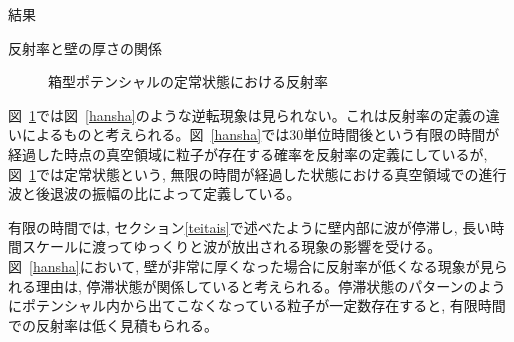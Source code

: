 \documentclass[a4paper, lualatex]{bxjsarticle}
\newcommand{\fref}[1]{図~\ref{#1}}
\begin{document}
\begin{section}{結果}
\begin{subsection}{反射率と壁の厚さの関係}
\begin{figure}[h]
            \caption{箱型ポテンシャルの定常状態における反射率}
            \label{hako}
        \end{figure}
        \par \fref{hako}では\fref{hansha}のような逆転現象は見られない。これは反射率の定義の違いによるものと考えられる。\fref{hansha}では30単位時間後という有限の時間が経過した時点の真空領域に粒子が存在する確率を反射率の定義にしているが, \fref{hako}では定常状態という, 無限の時間が経過した状態における真空領域での進行波と後退波の振幅の比によって定義している。
        \par 有限の時間では, セクション\ref{teitais}で述べたように壁内部に波が停滞し, 長い時間スケールに渡ってゆっくりと波が放出される現象の影響を受ける。\fref{hansha}において, 壁が非常に厚くなった場合に反射率が低くなる現象が見られる理由は, 停滞状態が関係していると考えられる。停滞状態のパターンのようにポテンシャル内から出てこなくなっている粒子が一定数存在すると, 有限時間での反射率は低く見積もられる。
    \end{subsection}
\end{section}

\newpage
\end{document}
